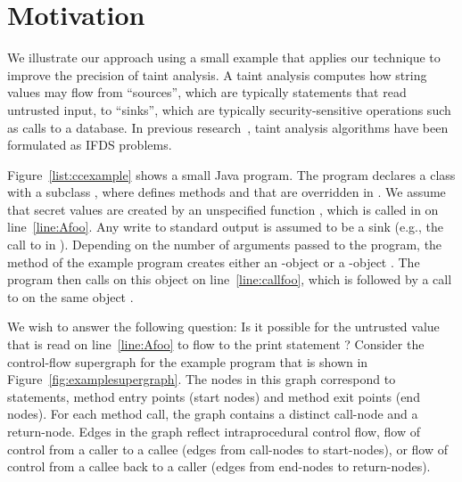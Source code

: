 \section{Motivation}
  \label{sec:MotivatingExample}
  
We illustrate our approach using a small example that
applies our technique to improve the precision of taint analysis.
A taint analysis computes how string values
may flow from ``sources'', which are typically statements that read untrusted input, 
to ``sinks'', which are typically security-sensitive
operations such as calls to 
a database. In previous research~\cite{DBLP:conf/issta/GuarnieriPTDTB11,DBLP:conf/pldi/ArztRFBBKTOM14}, 
taint analysis algorithms have been formulated as IFDS problems.     



Figure~\ref{list:ccexample} shows a small Java program.
The program
declares a class  with a subclass ,  where  defines methods 
 and  that are overridden in .  
We assume  that secret values are created by 
an unspecified function , which is called in  on 
line~\ref{line:Afoo}. 
Any write to standard output 
is assumed to be a sink (e.g., the call to  in ).
Depending on the number of 
arguments passed to the program, the  method of the example program creates 
either an -object or a -object%
. The 
program then calls  on this object
on line~\ref{line:callfoo}, which is 
followed by a call to  on the same object%
.  

 
We wish to answer the following question: Is it possible for the untrusted value 
that is read on line~\ref{line:Afoo} to flow to the print statement%
?
Consider the control-flow
supergraph for the example program that is shown in Figure~\ref{fig:examplesupergraph}.
 The nodes in this graph correspond to statements, method entry points (start nodes) and 
method exit points (end nodes). For each method call, the graph contains a 
distinct call-node and a return-node. Edges in the graph reflect intraprocedural control flow, 
flow of control from a caller to a callee (edges from call-nodes to start-nodes), or
flow of control from a callee back to a caller (edges from end-nodes to return-nodes). 

